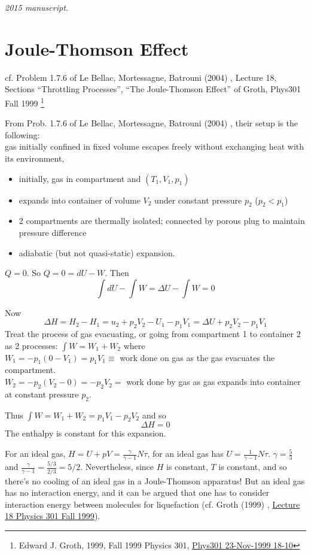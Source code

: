 \noindent\textit{2015 manuscript.}

\section{Joule-Thomson Effect}

cf. Problem 1.7.6 of Le Bellac, Mortessagne, Batrouni (2004) \cite{MLeBellacFMortessagneGBatrouni2004}, Lecture 18, Sections ``Throttling Processes'', ``The Joule-Thomson Effect'' of Groth, Phys301 Fall 1999 \footnote{Edward J. Groth, 1999, Fall 1999 Physics 301, \href{http://grothserver.princeton.edu/~groth/phys301f99/lect18.pdf}{Phys301 23-Nov-1999 18-10} }

From Prob. 1.7.6 of Le Bellac, Mortessagne, Batrouni (2004) \cite{MLeBellacFMortessagneGBatrouni2004}, their setup is the following: \\
gas initially confined in fixed volume escapes freely without exchanging heat with its environment, 
\begin{itemize}
\item initially, gas in compartment and $(T_1,V_1,p_1)$ 
\item expands into container of volume $V_2$ under constant pressure $p_2$ ($p_2<p_1$)
\item 2 compartments are thermally isolated; connected by porous plug to maintain pressure difference
\item adiabatic (but not quasi-static) expansion.
\end{itemize}

$Q=0$.  So $Q=0 = dU -W$.  Then
\[
\int dU - \int W = \Delta U - \int W = 0 
\]

Now
\[
\Delta H = H_2 - H_1 = u_2 + p_2 V_2 - U_1 - p_1 V_1 = \Delta U + p_2 V_2 - p_1 V_1 
\]
Treat the process of gas evacuating, or going from compartment 1 to container 2 as 2 processes:  $\int W = W_1 + W_2$ where \\
$W_1 = -p_1 (0-V_1) = p_1 V_1 \equiv $ work done on gas as the gas evacuates the compartment. \\
$W_2 = -p_2(V_2-0) = -p_2 V_2 = $ work done by gas as gas expands into container at constant pressure $p_2$.  

Thus $\int W = W_1 + W_2 = p_1 V_1 - p_2 V_2$ and so 
\[
\boxed{ \Delta H = 0 }
\]
The enthalpy is constant for this expansion.  

For an ideal gas, $H= U + pV = \frac{\gamma}{\gamma -1} N\tau$, for an ideal gas has $U = \frac{1}{\gamma -1} N\tau$.  $\gamma = \frac{5}{3}$ and $\frac{\gamma}{\gamma-1} = \frac{5/3}{ 2/3} = 5/2$.  Nevertheless, since $H$ is constant, $T$ is constant, and so there's no cooling of an ideal gas in a Joule-Thomson apparatus!  But an ideal gas has no interaction energy, and it can be argued that one has to consider interaction energy between molecules for liquefaction (cf. Groth (1999) \cite{EGroth1999}, \href{http://grothserver.princeton.edu/~groth/phys301f99/lect18.pdf}{Lecture 18 Physics 301 Fall 1999}).  

